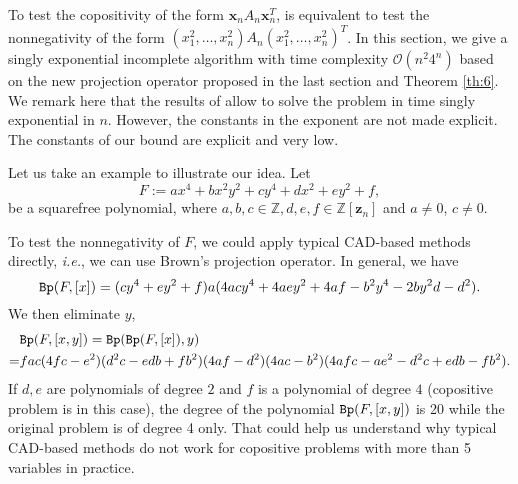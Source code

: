 \documentclass[amsthm]{elsart}
\def \Bproj  {{\tt Bp}}
\def  \zero {{\rm Zero}}
\def  \Nproj {{\tt Np}}
\def \RR {{\mathbb R}}
\def \ZZ {{\mathbb Z}}
\newcommand{\va}{\bm{\alpha}}
\newcommand{\xx}{\bm{x}}
\newcommand{\zz}{\bm{z}}
\def \OO {{\mathcal{O}}}
\begin{document}
To test the copositivity of the form $\xx_nA_n\xx_n^T$, is equivalent to test the nonnegativity of the form $(x_1^2,\ldots,x_n^2)A_n(x_1^2,\ldots,x_n^2)^T$.
In this section, we give a singly exponential incomplete algorithm with time complexity $\OO(n^2 4^n)$ based on the new projection operator proposed in the last section and Theorem \ref{th:6}.
We remark here that the results of \cite{basu1998new} allow to solve the problem in time singly exponential in $n$. However, the constants in the exponent are not made explicit. The constants of our bound are explicit and very low.
\begin{comment}
\begin{thm}
        Given a positive integer $n$. Let $f\in\ZZ[\xx_{n}]$ be a squarefree polynomial with level $n$ and $U$ a connected open set of $\Nproj(f,[x_{n},\ldots,x_j])\neq0$ in $\RR^{j-1}$. Denote $S=U\backslash\zero(\{\Nproj(f,[x_n,\dots,x_j],x_t)\mid t=j,\ldots,n\})$. The necessary and sufficient condition for $f(\xx_n)$ to be positive semi-definite on $U\times \RR^{n-j+1}$ is the following two conditions hold.\\
        $(1)$The polynomials in $\bigcup_{i=0}^{n-j} \Nproj_{1}(f,[x_{n-i}])$ are all semi-definite on $U\times \RR^{n-j}$.\\
        $(2)$There exists a point $\va \in S$ such that $f(\va,x_j,\ldots,x_n)$ is positive semi-definite on $\RR^{n-j+1}$.
\end{thm}
\end{comment}

Let us take an example to illustrate our idea. Let $$F:=ax^4+bx^2y^2+cy^4+dx^2+ey^2+f,$$
be a squarefree polynomial, where $a,b,c\in \ZZ,d,e,f\in\ZZ[\zz_{n}]$ and $a\neq0$, $c\neq 0$.

To test the nonnegativity of $F$, we could apply typical CAD-based methods directly, {\it i.e.}, we can use Brown's projection operator. In general, we have
$$\Bproj(F,[x])=(cy^4+ey^2+f)a(4acy^4+4aey^2+4af-b^2y^4-2by^2d-d^2).$$
We then eliminate $y$,
\begin{align*}
  &\Bproj(F,[x,y])=\Bproj(\Bproj(F,[x]),y)\\
  =&fac(4fc-e^2)(d^2c-edb+fb^2)(4af-d^2)(4ac-b^2)(4afc-ae^2-d^2c+edb-fb^2).
\end{align*}
If $d,e$ are polynomials of degree $2$ and $f$ is a polynomial of degree $4$ (copositive problem is in this case), the degree of the polynomial $\Bproj(F,[x,y])$ is 20 while the original problem is of degree 4 only. That could help us understand why typical CAD-based methods do not work for copositive problems with more than 5 variables in practice.
\end{document}
